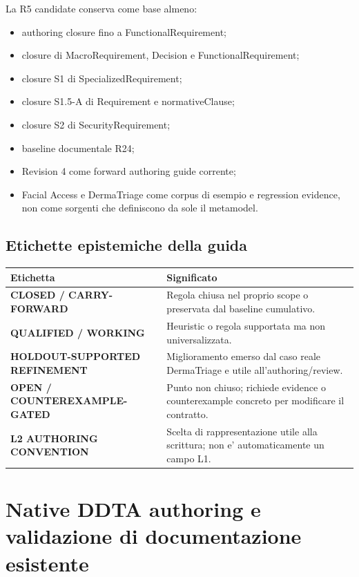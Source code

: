 \documentclass[11pt,a4paper]{article}
\begin{document}
La R5 candidate conserva come base almeno:
\begin{itemize}
  \item authoring closure fino a FunctionalRequirement;
  \item closure di MacroRequirement, Decision e FunctionalRequirement;
  \item closure S1 di SpecializedRequirement;
  \item closure S1.5-A di Requirement e normativeClause;
  \item closure S2 di SecurityRequirement;
  \item baseline documentale R24;
  \item Revision 4 come forward authoring guide corrente;
  \item Facial Access e DermaTriage come corpus di esempio e regression evidence, non come sorgenti che definiscono da sole il metamodel.
\end{itemize}

\subsection{Etichette epistemiche della guida}

\begin{tabularx}{\textwidth}{L{52mm}Y}
\toprule
\textbf{Etichetta} & \textbf{Significato} \\
\midrule
{\sffamily\bfseries\color{DDTAGreen}CLOSED / CARRY-FORWARD} & Regola chiusa nel proprio scope o preservata dal baseline cumulativo. \\
{\sffamily\bfseries\color{DDTAAmber}QUALIFIED / WORKING} & Heuristic o regola supportata ma non universalizzata. \\
{\sffamily\bfseries\color{DDTATeal}HOLDOUT-SUPPORTED REFINEMENT} & Miglioramento emerso dal caso reale DermaTriage e utile all'authoring/review. \\
{\sffamily\bfseries\color{DDTARed}OPEN / COUNTEREXAMPLE-GATED} & Punto non chiuso; richiede evidence o counterexample concreto per modificare il contratto. \\
{\sffamily\bfseries\color{DDTABlue}L2 AUTHORING CONVENTION} & Scelta di rappresentazione utile alla scrittura; non e' automaticamente un campo L1. \\
\bottomrule
\end{tabularx}

\section{Native DDTA authoring e validazione di documentazione esistente}
\end{document}
